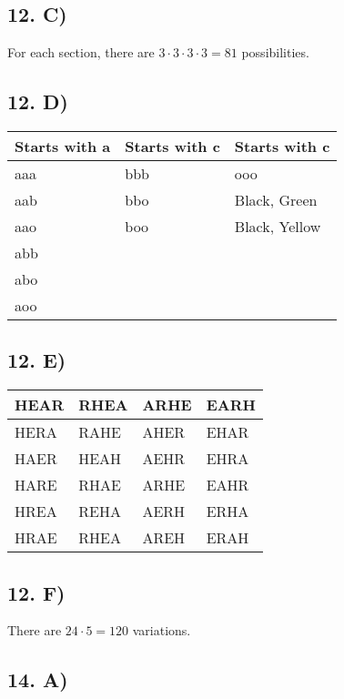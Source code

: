 \documentclass[12]{scrartcl}
\begin{document}
\subsection*{12. C)}
For each section, there are $3 \cdot 3 \cdot 3 \cdot 3 = 81$ possibilities. 
\subsection*{12. D)}
\begin{table}
    \begin{tabular}{|l|l|l|}
    \hline
    Starts with a & Starts with c & Starts with c \\ \hline
    aaa           & bbb           & ooo           \\ \hline
    aab           & bbo           & Black, Green  \\ \hline
    aao           & boo           & Black, Yellow \\ \hline
    abb           & ~             & ~             \\ \hline
    abo           & ~             & ~             \\ \hline
    aoo           & ~             & ~             \\ \hline
    \end{tabular}
\end{table}
\subsection*{12. E)}
\begin{table}
    \begin{tabular}{|l|l|l|l|}
    \hline
    HEAR & RHEA & ARHE & EARH \\ \hline
    HERA & RAHE & AHER & EHAR \\ \hline
    HAER & HEAH & AEHR & EHRA \\ \hline
    HARE & RHAE & ARHE & EAHR \\ \hline
    HREA & REHA & AERH & ERHA \\ \hline
    HRAE & RHEA & AREH & ERAH \\ \hline
    \end{tabular}
\end{table}
\subsection*{12. F)}
There are $24 \cdot 5 = 120$ variations. 
\subsection*{14. A)}
\ \\
\ \\
\ \\
\ \\
\ \\
\
\end{document}

